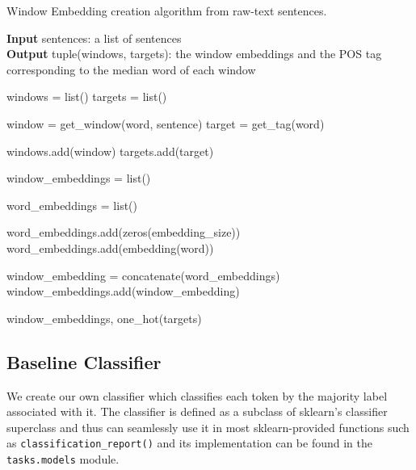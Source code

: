 \documentclass[10pt, a4paper]{article}
\begin{document}
	\begin{algorithm}
		\caption{Window Embedding creation algorithm from raw-text sentences.} 
		\label{al::window-embeds}
		
		\hspace*{\algorithmicindent} \textbf{Input} sentences: a list of sentences \\
		\hspace*{\algorithmicindent} \textbf{Output} tuple(windows, targets): the window embeddings and the POS tag corresponding to the median word of each window
		\begin{algorithmic}[1]	
			\State windows = list()
			\State targets = list()
			
			\State %
			
			
					\State window = get\_window(word, sentence)
					\State target = get\_tag(word)
					
					\State windows.add(window)
					\State targets.add(target)
				\EndFor
			
			\EndFor
			
			\State %
			
			\State window\_embeddings = list()
				
				\State word\_embeddings = list()
				
				
				
						\State word\_embeddings.add(zeros(embedding\_size))
					\Else
						\State word\_embeddings.add(embedding(word))
					\EndIf
					
				\EndFor
					
				\State window\_embedding = concatenate(word\_embeddings)
				\State window\_embeddings.add(window\_embedding)
			\EndFor
		
			\State %
			
			\State \Return window\_embeddings, one\_hot(targets)
			
		\end{algorithmic} 
	\end{algorithm}


	\subsection{Baseline Classifier}
	
	We create our own classifier which classifies each token by the majority label associated with it. The classifier is defined as a subclass of sklearn's classifier superclass and thus can seamlessly use it in most sklearn-provided functions such as \texttt{classification\_report()} and its implementation can be found in the \texttt{tasks.models} module.
	
\end{document}
